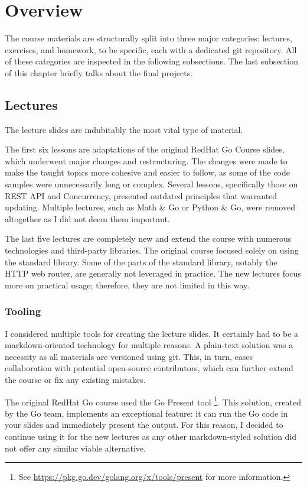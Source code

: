 \documentclass[
  digital,
  color,
  oneside,
  nosansbold,
  nocolorbold,
  lof,
  lot,
]{fithesis4}
\begin{document}
\section{Overview}

The course materials are structurally split into three major categories: lectures, exercises, and homework, to be specific, each with a dedicated git repository. All of these categories are inspected in the following subsections. The last subsection of this chapter briefly talks about the final projects.

\subsection{Lectures}

The lecture slides are indubitably the most vital type of material. 

The first six lessons are adaptations of the original RedHat Go Course slides, which underwent major changes and restructuring. The changes were made to make the taught topics more cohesive and easier to follow, as some of the code samples were unnecessarily long or complex. Several lessons, specifically those on REST API and Concurrency, presented outdated principles that warranted updating. Multiple lectures, such as Math \& Go or Python \& Go, were removed altogether as I did not deem them important.

The last five lectures are completely new and extend the course with numerous technologies and third-party libraries. The original course focused solely on using the standard library. Some of the parts of the standard library, notably the HTTP web router, are generally not leveraged in practice. The new lectures focus more on practical usage; therefore, they are not limited in this way.

\subsubsection{Tooling}

I considered multiple tools for creating the lecture slides. It certainly had to be a markdown-oriented technology for multiple reasons. A plain-text solution was a necessity as all materials are versioned using git. This, in turn, eases collaboration with potential open-source contributors, which can further extend the course or fix any existing mistakes.

The original RedHat Go course used the Go Present tool
\footnote{See \url{https://pkg.go.dev/golang.org/x/tools/present} for more information.}.
This solution, created by the Go team, implements an exceptional feature: it can run the Go code in your slides and immediately present the output. For this reason, I decided to continue using it for the new lectures as any other markdown-styled solution did not offer any similar viable alternative.
\end{document}
